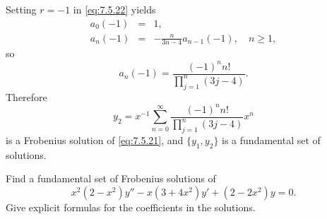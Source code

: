 \begin{examplesolution}
Setting $r=-1$ in \eqref{eq:7.5.22} yields
\begin{eqnarray*}
  a_{0}(-1) & = & 1, \\
  a_{n}(-1) & = & -\frac{n}{3n-4}a_{n-1}(-1),\quad n\ge1,
\end{eqnarray*}
so
\[
  a_{n}(-1)=\frac{(-1)^{n}n!}{\prod_{j=1}^{n}(3j-4)}.
\]
Therefore
\[
  y_{2}=x^{-1}\sum_{n=0}^{\infty}\frac{(-1)^{n}n!}{\prod_{j=1}^{n}(3j-4)}x^{n}
\]
is a Frobenius solution of \eqref{eq:7.5.21}, and $\{y_{1},y_{2}\}$ is a fundamental set of
solutions. \bbox
\end{examplesolution}

\setcounter{example}{2}
\setcounter{equation}{24}
\begin{example}
  \label{example:7.5.3}\rm Find a fundamental set of Frobenius solutions of
  \begin{equation}
    \label{eq:7.5.25}x^{2}(2-x^{2})y''-x(3+4x^{2})y'+(2-2x^{2})y=0.
  \end{equation}
  Give explicit formulas for the coefficients in the solutions.
\end{example}
\setcounter{equation}{25}
